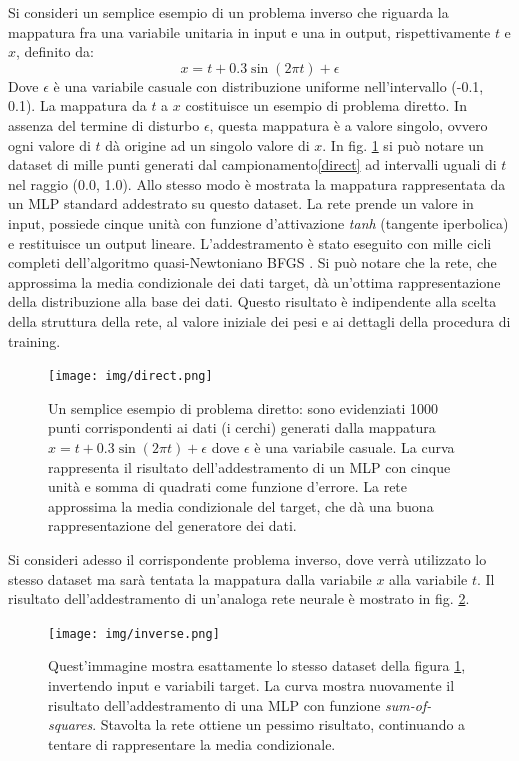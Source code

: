 Si consideri un semplice esempio di un problema inverso che riguarda la mappatura fra una variabile unitaria in input e una in output, rispettivamente $t$ e $x$, definito da:
\begin{equation}
	\label{direct}
	x = t + 0.3 \sin(2 \pi t) + \epsilon
\end{equation}
Dove $\epsilon$ è una variabile casuale con distribuzione uniforme nell'intervallo (-0.1, 0.1). La mappatura da $t$ a $x$ costituisce un esempio di problema diretto. In assenza del termine di disturbo $\epsilon$, questa mappatura è a valore singolo, ovvero ogni valore di $t$ dà origine ad un singolo valore di $x$. In fig. \ref{fig:1.20} si può notare un dataset di mille punti generati dal campionamento\ref{direct} ad intervalli uguali di $t$ nel raggio (0.0, 1.0). Allo stesso modo è mostrata la mappatura rappresentata da un MLP standard addestrato su questo dataset. La rete prende un valore in input, possiede cinque unità con funzione d'attivazione \textit{tanh} (tangente iperbolica) e restituisce un output lineare. L'addestramento è stato eseguito con mille cicli completi dell'algoritmo quasi-Newtoniano BFGS \cite{bfgs}. Si può notare che la rete, che approssima la media condizionale dei dati target, dà un'ottima rappresentazione della distribuzione alla base dei dati. Questo risultato è indipendente alla scelta della struttura della rete, al valore iniziale dei pesi e ai dettagli della procedura di training.
\begin{figure}[ht]
	\centering
	\texttt{[image: img/direct.png]}
	\caption{Un semplice esempio di problema diretto: sono evidenziati 1000 punti corrispondenti ai dati (i cerchi) generati dalla mappatura $x = t + 0.3 \sin(2 \pi t) + \epsilon$ dove $\epsilon$ è una variabile casuale. La curva rappresenta il risultato dell'addestramento di un MLP con cinque unità e somma di quadrati come funzione d'errore. La rete approssima la media condizionale del target, che dà una buona rappresentazione del generatore dei dati.}
	\label{fig:1.20}
\end{figure}

Si consideri adesso il corrispondente problema inverso, dove verrà utilizzato lo stesso dataset ma sarà tentata la mappatura dalla variabile $x$ alla variabile $t$. Il risultato dell'addestramento di un'analoga rete neurale è mostrato in fig. \ref{fig:1.21}.
\begin{figure}[ht]
	\centering
	\texttt{[image: img/inverse.png]}
	\caption{Quest'immagine mostra esattamente lo stesso dataset della figura \ref{fig:1.20}, invertendo input e variabili target. La curva mostra nuovamente il risultato dell'addestramento di una MLP con funzione \textit{sum-of-squares}. Stavolta la rete ottiene un pessimo risultato, continuando a tentare di rappresentare la media condizionale.}
	\label{fig:1.21}
\end{figure}

